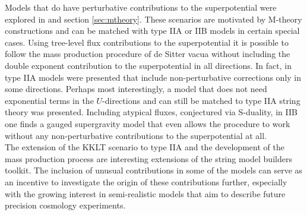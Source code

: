 \documentclass[a4paper,12pt]{report}
\begin{document}
Models that do have perturbative contributions to the superpotential were explored in \cite{Cribiori:2019hrb} and section \ref{sec:mtheory}. These scenarios are motivated by M-theory constructions and can be matched with type IIA or IIB models in certain special cases. Using tree-level flux contributions to the superpotential it is possible to follow the mass production procedure of de Sitter vacua without including the double exponent contribution to the superpotential in all directions. In fact, in type IIA models were presented that include non-perturbative corrections only in some directions. Perhaps most interestingly, a model that does not need exponential terms in the $U$-directions and can still be matched to type IIA string theory was presented. Including atypical fluxes, conjectured via S-duality, in IIB one finds a gauged supergravity model that even allows the procedure to work without any non-perturbative contributions to the superpotential at all.\\
The extension of the KKLT scenario to type IIA and the development of the mass production process are interesting extensions of the string model builders toolkit. The inclusion of unusual contributions in some of the models can serve as an incentive to investigate the origin of these contributions further, especially with the growing interest in semi-realistic models that aim to describe future precision cosmology experiments.
\end{document}
